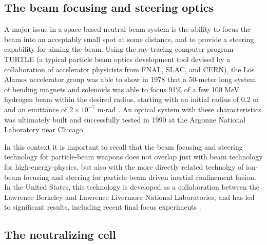 \documentclass [12pt,a4paper,     ]{report} %
\begin{document}
\subsection{The beam focusing and steering optics}  

A major issue in a space-based neutral beam system is the ability to focus the beam into an acceptably small spot at some distance, and to provide a steering capability for aiming the beam.  Using the ray-tracing computer program TURTLE (a typical particle beam optics development tool devised by a collaboration of accelerator physicists from FNAL, SLAC, and CERN), the Los Alamos accelerator group was able to show in 1978 that a 50-meter long system of bending magnets and solenoids was able to focus 91\% of a few 100 MeV hydrogen beam within the desired radius, starting with an initial radius of 0.2 m and an emittance of $2 \times 10^{-7}$ m$\cdot$rad \cite[p.52--62]{KNAPP1980-}.  An optical system with these characteristics was ultimately built and successfully tested in 1990 at the Argonne National Laboratory near Chicago. 

In this context it is important to recall that the beam focusing and steering technology for particle-beam weapons does not overlap just with beam technology for high-energy-physics, but also with the more directly related technolgy of ion-beam focusing and steering for particle-beam driven inertial confinement fusion.  In the United States, this technology is developed as a collaboration between the Lawrence Berkeley and Lawrence Livermore National Laboratories, and has led to significant results, including recent final focus experiments \cite{MACLA2001-}.


\subsection{The neutralizing cell}
\end{document}
